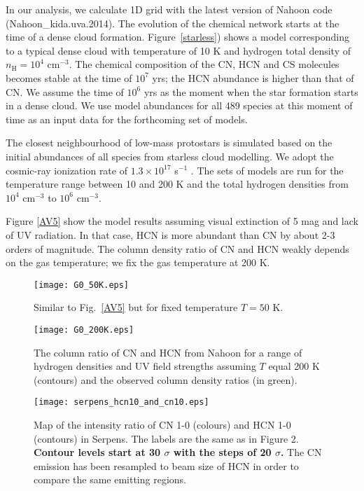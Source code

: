 \documentclass{aa}
\begin{document}
In our analysis, we calculate 1D grid with the latest version of Nahoon code (Nahoon\_kida.uva.2014). 
The evolution of the chemical network starts at the time of a dense cloud formation.
Figure~\ref{starless}) shows a model corresponding to a typical dense cloud with temperature of 10 K
and hydrogen total density of $n_\mathrm{H} = 10^4$ cm$^{-3}$. The chemical composition
of the CN, HCN and CS molecules becomes stable at the time of $10^{7}$ yrs; the HCN abundance is higher
than that of CN. We assume the time of $10^{6}$ yrs as the moment when the star formation starts in
a dense cloud. We use model abundances for all 489 species at this moment of time 
as an input data for the forthcoming set of models.

The closest neighbourhood of low-mass protostars is simulated based on the initial abundances of
all species from starless cloud modelling. We adopt the cosmic-ray ionization
rate of $1.3\times 10^{17}$ s$^{-1}$ \citep{Cra78}. The sets of models are run
for the temperature range between 10 and 200 K and the total hydrogen densities from $10^4$
cm$^{-3}$ to $10^6$ cm$^{-3}$. 

Figure \ref{AV5} show the model results assuming visual extinction of 5 mag and lack 
of UV radiation. In that case, HCN is more abundant than CN by about 2-3
orders of magnitude. The column density ratio of CN and HCN weakly depends on the 
gas temperature; we fix the gas temperature at 200 K.
\begin{figure} 
\centering \texttt{[image: G0\_50K.eps]} 
\caption{Similar to
Fig.~\ref{AV5} but for fixed temperature $T = 50$ K.} 
\label{G0} 
\end{figure}
\begin{figure} 
\centering 
\texttt{[image: G0\_200K.eps]} 
\caption{The column ratio of CN and HCN from Nahoon for a 
range of hydrogen densities and UV field strengths assuming $T$ equal 200 K (contours) 
and the observed column density ratios (in green).} 
\label{G0} 
\end{figure}
\begin{figure} 
\centering 
\texttt{[image: serpens\_hcn10\_and\_cn10.eps]}
\caption{Map of the intensity ratio of CN 1-0 (colours) and HCN 1-0
(contours) in Serpens. The labels are the same as in Figure 2. \textbf{Contour levels start at 30 $\sigma$ with the steps of 20 $\sigma$.}
The CN emission has been resampled to beam size of HCN in order to compare the same emitting regions.} 
\label{cn10_and_hcn10} 
\end{figure}
\end{document}

